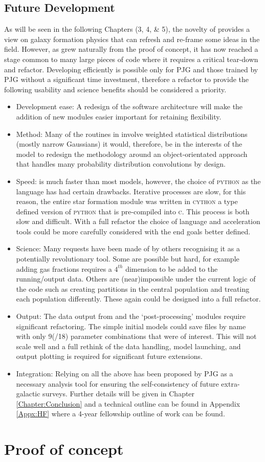 \subsection{Future Development}
\label{subsec:FutureDev}
As will be seen in the following Chapters (3, 4, \& 5), the novelty of \steel provides a view on galaxy formation physics that can refresh and re-frame some ideas in the field. However, as \steel grew naturally from the proof of concept, it has now reached a stage common to many large pieces of code where it requires a critical tear-down and refactor. Developing \steel efficiently is possible only for PJG and those trained by PJG without a significant time investment, therefore a refactor to provide the following usability and science benefits should be considered a priority. 
\begin{itemize}
    \item Development ease: A redesign of the software architecture will make the addition of new modules easier important for retaining flexibility.
    \item Method: Many of the routines in \steel involve weighted statistical distributions (mostly narrow Gaussians) it would, therefore, be in the interests of the model to redesign the methodology around an object-orientated approach that handles many probability distribution convolutions by design.
    \item Speed: \steel is much faster than most models, however, the choice of \textsc{python} as the language has had certain drawbacks. Iterative processes are slow, for this reason, the entire star formation module was written in \textsc{cython} a type defined version of \textsc{python} that is pre-compiled into \textsc{c}. This process is both slow and difficult. With a full refactor the choice of language and acceleration tools could be more carefully considered with the end goals better defined.
    \item Science: Many requests have been made of \steel by others recognising it as a potentially revolutionary tool. Some are possible but hard, for example adding gas fractions requires a $4^{th}$ dimension to be added to the running/output data. Others are (near)impossible under the current logic of the code such as creating partitions in the central population and treating each population differently. These again could be designed into a full refactor.
    \item Output: The data output from \steel and the `post-processing' modules require significant refactoring. The simple initial models could save files by name with only 9(/18) parameter combinations that were of interest. This will not scale well and a full rethink of the data handling, model launching, and output plotting is required for significant future extensions.
    \item Integration: Relying on all the above \steel has been proposed by PJG as a necessary analysis tool for ensuring the self-consistency of future extra-galactic surveys. Further details will be given in Chapter \ref{Chapter:Conclusion} and a technical outline can be found in Appendix \ref{Appx:HF} where a 4-year fellowship outline of work can be found.
\end{itemize}

\pagebreak
\section{Proof of concept}
\label{sec:Proof}
\inputminted{python}{Codes/Proof.py}
